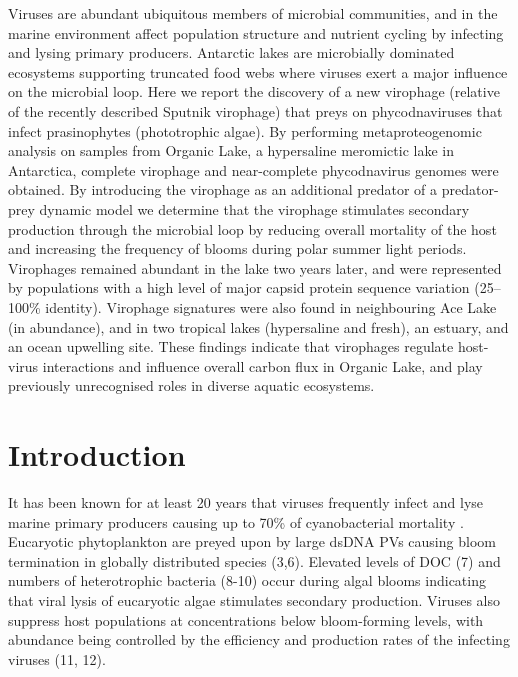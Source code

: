 Viruses are abundant ubiquitous members of microbial communities, and in the marine environment affect population structure and nutrient cycling by infecting and lysing primary producers. 
Antarctic lakes are microbially dominated ecosystems supporting truncated food webs where viruses exert a major influence on the microbial loop. 
Here we report the discovery of a new virophage (relative of the recently described Sputnik virophage) that preys on phycodnaviruses that infect prasinophytes (phototrophic algae). 
By performing metaproteogenomic analysis on samples from Organic Lake, a hypersaline meromictic lake in Antarctica, complete virophage and near-complete phycodnavirus genomes were obtained. 
By introducing the virophage as an additional predator of a predator-prey dynamic model we determine that the virophage stimulates secondary production through the microbial loop by reducing overall mortality of the host and increasing the frequency of blooms during polar summer light periods. 
Virophages remained abundant in the lake two years later, and were represented by populations with a high level of major capsid protein sequence variation (25--100\% identity). 
Virophage signatures were also found in neighbouring Ace Lake (in abundance), and in two tropical lakes (hypersaline and fresh), an estuary, and an ocean upwelling site. 
These findings indicate that virophages regulate host-virus interactions and influence overall carbon flux in Organic Lake, and play previously unrecognised roles in diverse aquatic ecosystems.
\newpage


\section{Introduction}
It has been known for at least 20 years that viruses frequently infect and lyse marine primary producers causing up to 70\% of cyanobacterial mortality \cite{Proctor1990,Suttle1990}.
Eucaryotic phytoplankton are preyed upon by large ds\textsc{DNA} \acp{PV} causing bloom termination in globally distributed species (3,6).
Elevated levels of \ac{DOC} (7) and numbers of heterotrophic bacteria (8-10) occur during algal blooms indicating that viral lysis of eucaryotic algae stimulates secondary production. 
Viruses also suppress host populations at concentrations below bloom-forming levels, with abundance being controlled by the efficiency and production rates of the infecting viruses (11, 12). 

